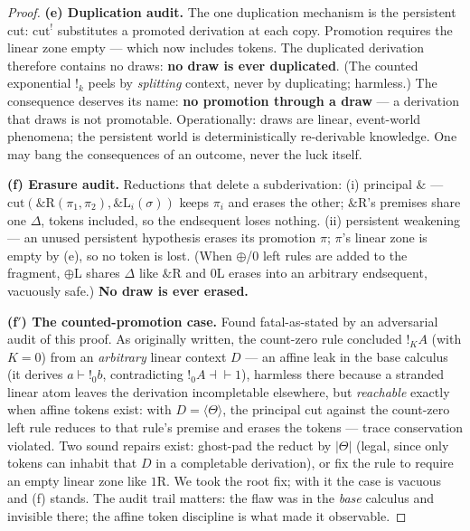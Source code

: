\documentclass[11pt]{article}
\newcommand{\gbang}[1]{{!}_{#1}}                 %
\newcommand{\addconj}{\mathbin{\&}}              %
\newcommand{\adddisj}{\oplus}                    %
\newcommand{\bang}{{!}}                          %
\newcommand{\trz}[1]{\langle #1\rangle}            %
\newcommand{\Tr}{\Theta}                           %
\theoremstyle{definition}
\theoremstyle{remark}
\begin{document}
\begin{proof}
\medskip\noindent\textbf{(e) Duplication audit.}  The one duplication
mechanism is the persistent cut: $\mathrm{cut}^{\bang}$ substitutes a
promoted derivation at each copy.  Promotion requires the linear zone
empty --- which now includes tokens.  The duplicated derivation
therefore contains no draws: \textbf{no draw is ever duplicated}.  (The
counted exponential $\gbang{k}$ peels by \emph{splitting} context,
never by duplicating; harmless.)  The consequence deserves its name:
\textbf{no promotion through a draw} --- a derivation that draws is not
promotable.  Operationally: draws are linear, event-world phenomena;
the persistent world is deterministically re-derivable knowledge.  One
may bang the consequences of an outcome, never the luck itself.

\medskip\noindent\textbf{(f) Erasure audit.}  Reductions that delete a
subderivation: (i) principal $\addconj$ ---
$\mathrm{cut}(\addconj\text{R}(\pi_1,\pi_2), \addconj\text{L}_i(\sigma))$
keeps $\pi_i$ and erases the other; $\addconj$R's premises share one
$\Delta$, tokens included, so the endsequent loses nothing.
(ii) persistent weakening --- an unused persistent hypothesis erases
its promotion $\pi$; $\pi$'s linear zone is empty by (e), so no token
is lost.  (When $\adddisj$/$0$ left rules are added to the fragment,
$\adddisj$L shares $\Delta$ like $\addconj$R and $0$L erases into an
arbitrary endsequent, vacuously safe.)  \textbf{No draw is ever
erased.}

\medskip\noindent\textbf{(f$'$) The counted-promotion case.}  Found
fatal-as-stated by an adversarial audit of this proof.  As originally
written, the count-zero rule concluded $\gbang{K}A$ (with
$K\!=\!0$) from an \emph{arbitrary} linear context $D$ --- an affine
leak in the base calculus (it derives $a \vdash \gbang{0}b$,
contradicting $\gbang0 A \dashv\vdash 1$), harmless there because a
stranded linear atom leaves the derivation incompletable elsewhere,
but \emph{reachable} exactly when affine tokens exist: with
$D = \trz{\Tr}$, the principal cut against the count-zero left rule
reduces to that rule's premise and erases the tokens --- trace
conservation violated.  Two sound repairs exist: ghost-pad the reduct
by $|\Tr|$ (legal, since only tokens can inhabit that $D$ in a
completable derivation), or fix the rule to require an empty linear
zone like $1$R.  We took the root fix; with it the case is vacuous and
(f) stands.  The audit trail matters: the flaw was in the \emph{base}
calculus and invisible there; the affine token discipline is what made
it observable.


\end{proof}
\end{document}
